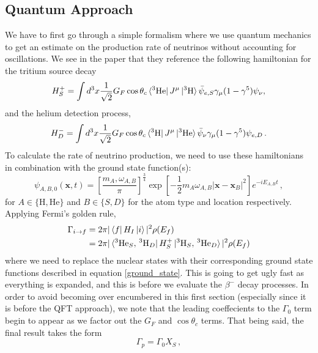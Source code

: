\documentclass[10pt]{article}
\begin{document}
\subsection{Quantum Approach}
We have to first go through a simple formalism where we use quantum mechanics to get an estimate on the production rate of neutrinos without accounting for oscillations. We see in the paper that they reference the following hamiltonian for the tritium source decay
\begin{equation}\label{source_h}
  H_{S}^{+} = \int d^{3}x\frac{1}{\sqrt{2}}G_{F}\cos\theta_{c}\bra{^{3}\textnormal{He}}J^{\mu}\ket{^{3}\textnormal{H}}\bar{\psi}_{e,S}\gamma_{\mu}(1-\gamma^{5})\psi_{\nu},
\end{equation}
and the helium detection process,
\begin{equation}
  H_{D}^{-} = \int d^{3}x\frac{1}{\sqrt{2}}G_{F}\cos\theta_{c}\bra{^{3}\textnormal{H}}J^{\mu}\ket{^{3}\textnormal{He}}\bar{\psi}_{\nu}\gamma_{\mu}(1-\gamma^{5})\psi_{e,D}\, .
\end{equation}
To calculate the rate of neutrino production, we need to use these hamiltonians in combination with the ground state function(s):
\begin{equation}\label{ground_state}
  \psi_{A,B,0}(\bm{x}, t) = \left[\frac{m_{A},\omega_{A,B}}{\pi}\right]^{\frac{3}{4}}\exp\left[-\frac{1}{2}m_{A}\omega_{A,B}|\bm{x} - \bm{x}_{B}|^{2}\right]e^{-iE_{A,B}t}\, ,
\end{equation}
for $A \in \{\text{H}, \text{He}\}$ and $B\in \{S, D\}$ for the atom type and location respectively. Applying Fermi's golden rule,
\begin{align*}
  \Gamma_{i \to f} & = 2\pi|\bra{f}H_{I}\ket{i}|^{2}\rho(E_{f}) \\
  & = 2\pi|\bra{^{3}\text{He}_{S},\, ^{3}\text{H}_{D}}H_{S}^{+}\ket{^{3}\text{H}_{S},\, ^{3}\text{He}_{D}}|^{2}\rho(E_{f})
\end{align*}
where we need to replace the nuclear states with their corresponding ground state functions described in equation \ref{ground_state}. This is going to get ugly fast as everything is expanded, and this is before we evaluate the $\beta^{-}$ decay processes. In order to avoid becoming over encumbered in this first section (especially since it is before the QFT approach), we note that the leading coeffecients to the $\Gamma_{0}$ term begin to appear as we factor out the $G_{F}$ and $\cos\theta_{c}$ terms. That being said, the final result takes the form
\begin{equation}
  \Gamma_{p} = \Gamma_{0}X_{S}\, ,
\end{equation}
\end{document}
